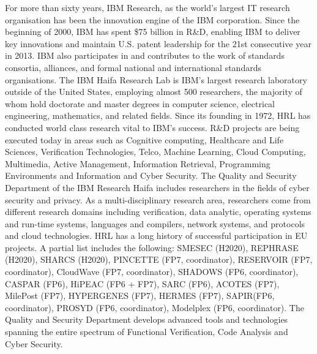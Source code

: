 \documentclass[a4paper,11pt]{article}
\begin{document}
For more than sixty years, IBM Research, as the world's largest IT research organisation has been the innovation engine of the IBM corporation. Since the beginning of 2000, IBM has spent \$75 billion in R\&D, enabling IBM to deliver key innovations and maintain U.S. patent leadership for the 21st consecutive
year in 2013.
IBM also participates in and contributes to the work of standards consortia, alliances, and formal national and international standards organisations. 
The IBM Haifa Research Lab is IBM's largest research laboratory outside of the United States, 
employing almost 500 researchers, the majority of whom hold doctorate and master degrees in computer science, electrical engineering, mathematics, and related fields. Since its founding in 1972, HRL has conducted world class research vital to IBM's success. R\&D projects are being executed today in areas such as Cognitive computing, Healthcare and Life Sciences, Verification Technologies, Telco, Machine Learning, Cloud Computing, Multimedia, Active Management, Information Retrieval, Programming Environments and Information and Cyber Security. The Quality and Security Department of the IBM Research Haifa includes researchers in the fields of cyber security and privacy. As a multi-disciplinary research area, researchers come from different research domains including verification, data analytic, operating systems and run-time systems, languages and compilers, network systems, and protocols and cloud technologies.
HRL has a long history of successful participation in EU projects. A partial list includes the following: SMESEC (H2020), REPHRASE (H2020), SHARCS (H2020), PINCETTE (FP7, coordinator), RESERVOIR (FP7, coordinator), CloudWave (FP7, coordinator), SHADOWS (FP6, coordinator), CASPAR (FP6), HiPEAC (FP6 + FP7), SARC (FP6), ACOTES (FP7), MilePost (FP7), HYPERGENES (FP7), HERMES (FP7), SAPIR(FP6, coordinator), PROSYD (FP6, coordinator), Modelplex (FP6, coordinator).
The Quality and Security Department develops advanced tools and technologies spanning the entire spectrum of Functional Verification, Code Analysis and Cyber Security.
\end{document}
